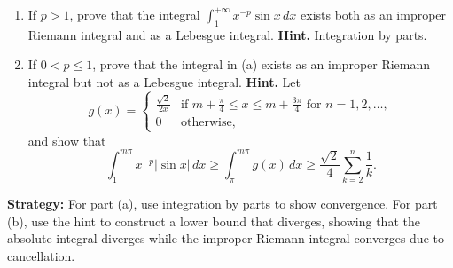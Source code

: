 \begin{problembox}
\begin{problemstatement}
\begin{enumerate}[label=(\alph*)]
\item If $p > 1$, prove that the integral $\int_1^{+\infty} x^{-p} \sin x \, dx$ exists both as an improper Riemann integral and as a Lebesgue integral. \textbf{Hint.} Integration by parts.
\item If $0 < p \leq 1$, prove that the integral in (a) exists as an improper Riemann integral but not as a Lebesgue integral. \textbf{Hint.} Let
\[g(x) = 
\begin{cases} 
\frac{\sqrt{2}}{2x} & \text{if } m + \frac{\pi}{4} \leq x \leq m + \frac{3\pi}{4} \text{ for } n = 1, 2, \ldots, \\ 
0 & \text{otherwise},
\end{cases}\]
and show that
\[\int_{1}^{m\pi} x^{-p} |\sin x| \, dx \geq \int_{\pi}^{m\pi} g(x) \, dx \geq \frac{\sqrt{2}}{4} \sum_{k=2}^{n} \frac{1}{k}.\]
\end{enumerate}
\end{problemstatement}
\end{problembox}

\noindent\textbf{Strategy:} For part (a), use integration by parts to show convergence. For part (b), use the hint to construct a lower bound that diverges, showing that the absolute integral diverges while the improper Riemann integral converges due to cancellation.

